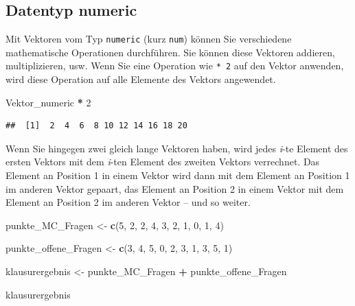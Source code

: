 \documentclass[
  ngerman,
]{book}
\newenvironment{Shaded}{\begin{snugshade}}{\end{snugshade}}
\newcommand{\DecValTok}[1]{\textcolor[rgb]{0.00,0.00,0.81}{#1}}
\newcommand{\FunctionTok}[1]{\textcolor[rgb]{0.13,0.29,0.53}{\textbf{#1}}}
\newcommand{\NormalTok}[1]{#1}
\newcommand{\OtherTok}[1]{\textcolor[rgb]{0.56,0.35,0.01}{#1}}
\newcommand{\SpecialCharTok}[1]{\textcolor[rgb]{0.81,0.36,0.00}{\textbf{#1}}}
\begin{document}
\subsection{Datentyp numeric}\label{datentyp-numeric}

Mit Vektoren vom Typ \texttt{numeric} (kurz \texttt{num}) können Sie verschiedene mathematische Operationen durchführen. Sie können diese Vektoren addieren, multiplizieren, usw. Wenn Sie eine Operation wie \texttt{*\ 2} auf den Vektor anwenden, wird diese Operation auf alle Elemente des Vektors angewendet.

\begin{Shaded}
\begin{Highlighting}[]
\NormalTok{Vektor\_numeric }\SpecialCharTok{*} \DecValTok{2}
\end{Highlighting}
\end{Shaded}

\begin{verbatim}
##  [1]  2  4  6  8 10 12 14 16 18 20
\end{verbatim}

Wenn Sie hingegen zwei gleich lange Vektoren haben, wird jedes \emph{i}-te Element des ersten Vektors mit dem \emph{i}-ten Element des zweiten Vektors verrechnet. Das Element an Position 1 in einem Vektor wird dann mit dem Element an Position 1 im anderen Vektor gepaart, das Element an Position 2 in einem Vektor mit dem Element an Position 2 im anderen Vektor -- und so weiter.

\begin{Shaded}
\begin{Highlighting}[]
\NormalTok{punkte\_MC\_Fragen }\OtherTok{\textless{}{-}} \FunctionTok{c}\NormalTok{(}\DecValTok{5}\NormalTok{, }\DecValTok{2}\NormalTok{, }\DecValTok{2}\NormalTok{, }\DecValTok{4}\NormalTok{, }\DecValTok{3}\NormalTok{, }\DecValTok{2}\NormalTok{, }\DecValTok{1}\NormalTok{, }\DecValTok{0}\NormalTok{, }\DecValTok{1}\NormalTok{, }\DecValTok{4}\NormalTok{)}

\NormalTok{punkte\_offene\_Fragen }\OtherTok{\textless{}{-}} \FunctionTok{c}\NormalTok{(}\DecValTok{3}\NormalTok{, }\DecValTok{4}\NormalTok{, }\DecValTok{5}\NormalTok{, }\DecValTok{0}\NormalTok{, }\DecValTok{2}\NormalTok{, }\DecValTok{3}\NormalTok{, }\DecValTok{1}\NormalTok{, }\DecValTok{3}\NormalTok{, }\DecValTok{5}\NormalTok{, }\DecValTok{1}\NormalTok{)}

\NormalTok{klausurergebnis }\OtherTok{\textless{}{-}}\NormalTok{ punkte\_MC\_Fragen }\SpecialCharTok{+}\NormalTok{ punkte\_offene\_Fragen}

\NormalTok{klausurergebnis}
\end{Highlighting}
\end{Shaded}
\end{document}
